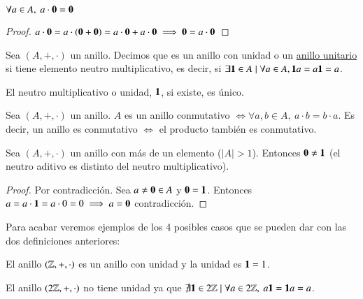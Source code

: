 \begin{pro}
	$\forall a \in A,\ a\cdot \mathbf{0} = \mathbf{0}$
\end{pro}

\begin{proof}
	$a \cdot \mathbf{0} = a \cdot(\mathbf{0} + \mathbf{0}) = a\cdot \mathbf{0} + a\cdot \mathbf{0} \implies \mathbf{0} = a\cdot \mathbf{0}$
\end{proof}

\begin{dfn}
	Sea $(A, +, \cdot)$ un anillo. Decimos que es un anillo con unidad o un \underline{anillo unitario} si tiene elemento neutro multiplicativo, es decir, si $\exists \mathbf{1} \in A \mid \forall a \in A, \mathbf{1} a = a \mathbf{1} = a$.
\end{dfn}

\begin{pro}
	El neutro multiplicativo o unidad, $\mathbf{1}$, si existe, es único.
\end{pro}


\begin{dfn}
	Sea $(A, +, \cdot)$ un anillo. $A$ es un anillo conmutativo $\iff \forall a, b \in A,\ a\cdot b = b \cdot a$. Es decir, un anillo es conmutativo $\iff$ el producto también es conmutativo.
\end{dfn}

\begin{pro}
	Sea $(A, +, \cdot)$ un anillo con más de un elemento ($|A| > 1$). Entonces $\mathbf{0} \neq \mathbf{1}$ (el neutro aditivo es distinto del neutro multiplicativo).
\end{pro}

\begin{proof}
	Por contradicción. Sea $a \neq \mathbf{0} \in A$ y $\mathbf{0} = \mathbf{1}$. Entonces $a = a\cdot \mathbf{1} = a\cdot 0 = 0 \implies a = \mathbf{0}$ contradicción.
\end{proof}

Para acabar veremos ejemplos de los 4 posibles casos que se pueden dar con las dos definiciones anteriores:

\begin{ej}
	El anillo $(\mathbb{Z}, +, \cdot)$ es un anillo con unidad y la unidad es $\mathbf{1} = 1$.
\end{ej}

\begin{ej}
	El anillo $(2\mathbb{Z}, +, \cdot)$ no tiene unidad ya que $\nexists \mathbf{1} \in 2\mathbb{Z} \mid \forall a \in 2\mathbb{Z},\ a\mathbf{1} = \mathbf{1}a = a$.
\end{ej}

